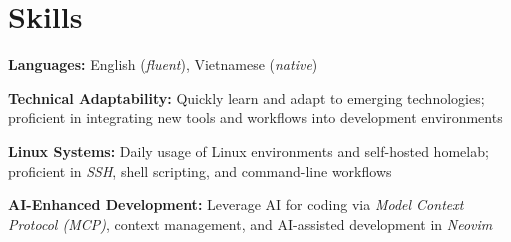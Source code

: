 \section{Skills}

\begin{onecolentry}
	\textbf{Languages:}
	English (\textit{fluent}),
	Vietnamese (\textit{native})
\end{onecolentry}

\vspace{0.2cm}

\begin{onecolentry}
	\textbf{Technical Adaptability:}
	Quickly learn and adapt to emerging technologies; proficient in integrating new tools and workflows into
	development environments
\end{onecolentry}

\vspace{0.2cm}

\begin{onecolentry}
	\textbf{Linux Systems:}
	Daily usage of Linux environments and self-hosted homelab; proficient in \textit{SSH},
	shell scripting, and command-line workflows
\end{onecolentry}

\vspace{0.2cm}

\begin{onecolentry}
	\textbf{AI-Enhanced Development:}
	Leverage AI for coding via \textit{Model Context Protocol (MCP)}, context management, and AI-assisted
	development in \textit{Neovim}
\end{onecolentry}
